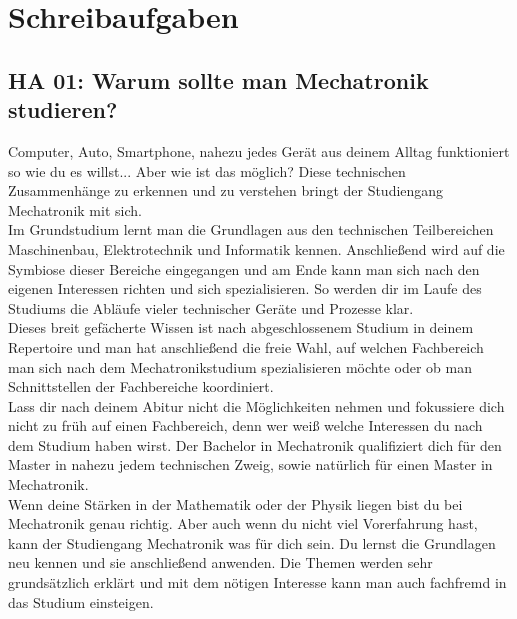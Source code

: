 \chapter{Schreibaufgaben}
\section{HA 01: Warum sollte man Mechatronik studieren?}
  Computer, Auto, Smartphone, nahezu jedes Gerät aus deinem Alltag funktioniert so wie du es willst... Aber wie ist das möglich? Diese technischen Zusammenhänge zu erkennen und zu verstehen bringt der Studiengang Mechatronik mit sich.\\
  Im Grundstudium lernt man die Grundlagen aus den technischen Teilbereichen Maschinenbau, Elektrotechnik und Informatik kennen. Anschließend wird auf die Symbiose dieser Bereiche eingegangen und am Ende kann man sich nach den eigenen Interessen richten und sich spezialisieren. So werden dir im Laufe des Studiums die Abläufe vieler technischer Geräte und Prozesse klar.\\%
  Dieses breit gefächerte Wissen ist nach abgeschlossenem Studium in deinem Repertoire und man hat anschließend die freie Wahl, auf welchen Fachbereich man sich nach dem Mechatronikstudium spezialisieren möchte oder ob man Schnittstellen der Fachbereiche koordiniert.\\
  Lass dir nach deinem Abitur nicht die Möglichkeiten nehmen und fokussiere   dich nicht zu früh auf einen Fachbereich, denn wer weiß welche Interessen du nach dem Studium haben wirst. Der Bachelor in Mechatronik qualifiziert dich für den Master in nahezu jedem technischen Zweig, sowie natürlich für einen Master in Mechatronik.\\
  Wenn deine Stärken in der Mathematik oder der Physik liegen bist du bei Mechatronik genau richtig. Aber auch wenn du nicht viel Vorerfahrung hast, kann der Studiengang Mechatronik was für dich sein. Du lernst die Grundlagen neu kennen und sie anschließend anwenden. Die Themen werden sehr grundsätzlich erklärt und mit dem nötigen Interesse kann man auch fachfremd in das Studium einsteigen.

